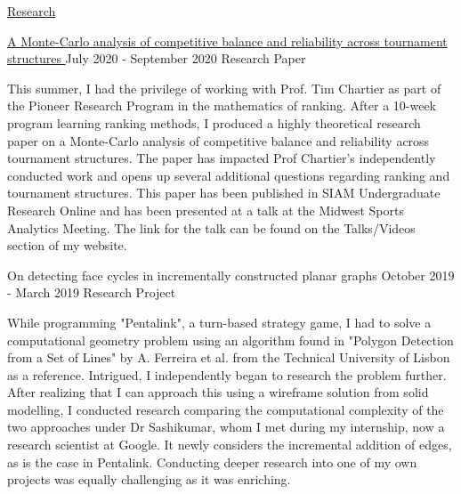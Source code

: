 \documentclass{resume} %
\begin{document}
\begin{rSection}{\href{ https://www.nitvishn.net/\#/research }{Research}}



\begin{rSubsection}{ 
     \href{ https://www.siam.org/Portals/0/Documents/S136704PDF.pdf?ver=2021-03-01-130112-520 }{ A Monte-Carlo analysis of competitive balance and reliability across tournament structures } 
    }{ 
     July 2020 - September 2020 
     }{  Research Paper  }
\item This summer, I had the privilege of working with Prof. Tim Chartier as part of the Pioneer Research Program in the mathematics of ranking. After a 10-week program learning ranking methods, I produced a highly theoretical research paper on a Monte-Carlo analysis of competitive balance and reliability across tournament structures. The paper has impacted Prof Chartier's independently conducted work and opens up several additional questions regarding ranking and tournament structures. This paper has been published in SIAM Undergraduate Research Online and has been presented at a talk at the Midwest Sports Analytics Meeting. The link for the talk can be found on the Talks/Videos section of my website. 
\end{rSubsection}



\begin{rSubsection}{ 
     On detecting face cycles in incrementally constructed planar graphs 
    }{ 
     October 2019 - March 2019 
     }{  Research Project  }
\item While programming "Pentalink", a turn-based strategy game, I had to solve a computational geometry problem using an algorithm found in "Polygon Detection from a Set of Lines" by A. Ferreira et al. from the Technical University of Lisbon as a reference. Intrigued, I independently began to research the problem further. After realizing that I can approach this using a wireframe solution from solid modelling, I conducted research comparing the computational complexity of the two approaches under Dr Sashikumar, whom I met during my internship, now a research scientist at Google. It newly considers the incremental addition of edges, as is the case in Pentalink. Conducting deeper research into one of my own projects was equally challenging as it was enriching. 
\end{rSubsection}


\end{rSection}
\end{document}
